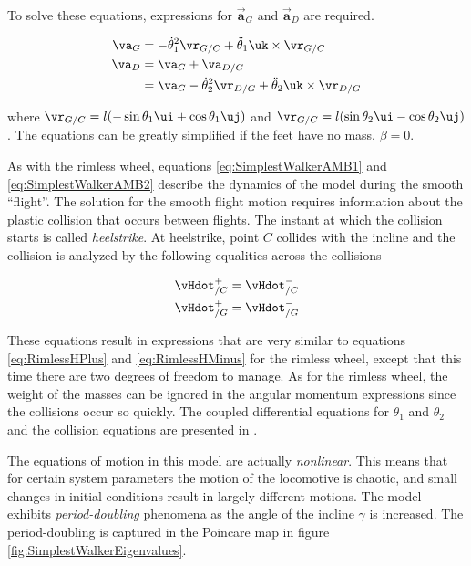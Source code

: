 To solve these equations, expressions for $\vec{\mathbf{a}}_{G}$ and $\vec{\mathbf{a}}_{D}$ are required.

\begin{align}
\va_{G} &= -\dot{\theta}_{1}^{2} \vr_{G/C} + \ddot{\theta}_{1} \uk \times \vr_{G/C} \\
\va_{D}  &= \va_{G} + \va_{D/G} \notag \\
 &= \va_{G}  -\dot{\theta}_{2}^{2} \vr_{D/G} + \ddot{\theta}_{2} \uk \times \vr_{D/G}
\end{align}

where $\vr_{G/C} = l (- \sin{\theta_{1}} \ui +\cos{\theta_{1}} \uj)$ and $\vr_{G/C} = l (\sin{\theta_{2}} \ui - \cos{\theta_{2}} \uj)$. The equations can be greatly simplified if the feet have no mass, $\beta = 0$.


As with the rimless wheel, equations \ref{eq:SimplestWalkerAMB1} and \ref{eq:SimplestWalkerAMB2} describe the dynamics of the model during the smooth ``flight''. The solution for the smooth flight motion requires information about the plastic collision that occurs between flights. The instant at which the collision starts is called \textit{heelstrike}. At heelstrike, point $C$ collides with the incline and the collision is analyzed by the following equalities across the collisions

\begin{align}
\vHdot_{/C}^{+} &= \vHdot_{/C}^{-} \notag \\
\vHdot_{/G}^{+} &= \vHdot_{/G}^{-} \notag
\label{eq:SimplestWalkerCollision}
\end{align}

These equations result in expressions that are very similar to equations \ref{eq:RimlessHPlus} and \ref{eq:RimlessHMinus} for the rimless wheel, except that this time there are two degrees of freedom to manage. As for the rimless wheel, the weight of the masses can be ignored in the angular momentum expressions since the collisions occur so quickly. The coupled differential equations for $\theta_{1}$ and $\theta_{2}$ and the collision equations are presented in \cite{garcia97}. 

The equations of motion in this model are actually \emph{nonlinear}. This means that for certain system parameters the motion of the locomotive is chaotic, and small changes in initial conditions result in largely different motions. The model exhibits \emph{period-doubling} phenomena as the angle of the incline $\gamma$ is increased. The period-doubling is captured in the Poincare map in figure \ref{fig:SimplestWalkerEigenvalues}.

